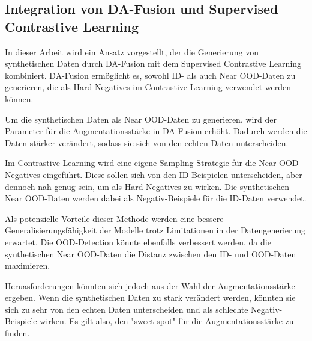 
\subsection{Integration von DA-Fusion und Supervised Contrastive Learning} \label{subsec:da-fusion-supcon}

In dieser Arbeit wird ein Ansatz vorgestellt, der die Generierung von synthetischen Daten durch DA-Fusion mit dem Supervised Contrastive Learning kombiniert. DA-Fusion ermöglicht es, sowohl ID- als auch Near OOD-Daten zu generieren, die als Hard Negatives im Contrastive Learning verwendet werden können.

Um die synthetischen Daten als Near OOD-Daten zu generieren, wird der Parameter für die Augmentationsstärke in DA-Fusion erhöht. Dadurch werden die Daten stärker verändert, sodass sie sich von den echten Daten unterscheiden.

Im Contrastive Learning wird eine eigene Sampling-Strategie für die Near OOD-Negatives eingeführt. Diese sollen sich von den ID-Beispielen unterscheiden, aber dennoch nah genug sein, um als Hard Negatives zu wirken. Die synthetischen Near OOD-Daten werden dabei als Negativ-Beispiele für die ID-Daten verwendet.

Als potenzielle Vorteile dieser Methode werden eine bessere Generalisierungsfähigkeit der Modelle trotz Limitationen in der Datengenerierung erwartet. Die OOD-Detection könnte ebenfalls verbessert werden, da die synthetischen Near OOD-Daten die Distanz zwischen den ID- und OOD-Daten maximieren.

Heruasforderungen könnten sich jedoch aus der Wahl der Augmentationsstärke ergeben. Wenn die synthetischen Daten zu stark verändert werden, könnten sie sich zu sehr von den echten Daten unterscheiden und als schlechte Negativ-Beispiele wirken. Es gilt also, den "sweet spot" für die Augmentationsstärke zu finden.
